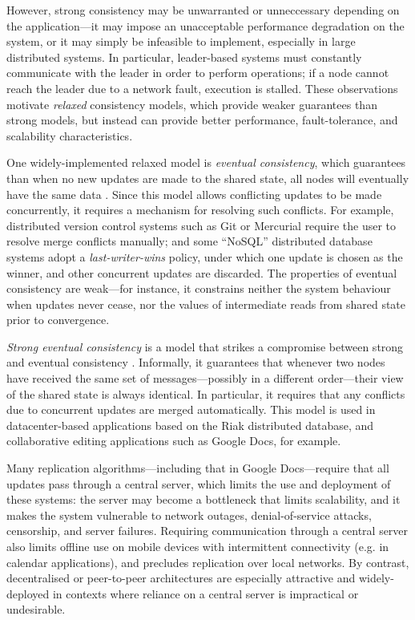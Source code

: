 \documentclass[acmlarge,review,anonymous]{acmart}\settopmatter{printfolios=true}
\begin{document}
However, strong consistency may be unwarranted or unneccessary depending on the application---it may impose an unacceptable performance degradation on the system, or it may simply be infeasible to implement, especially in large distributed systems.
In particular, leader-based systems must constantly communicate with the leader in order to perform operations; if a node cannot reach the leader due to a network fault, execution is stalled.
These observations motivate \emph{relaxed} consistency models, which provide weaker guarantees than strong models, but instead can provide better performance, fault-tolerance, and scalability characteristics.

One widely-implemented relaxed model is \emph{eventual consistency}, which guarantees than when no new updates are made to the shared state, all nodes will eventually have the same data \cite{Bailis:2013jc,Burckhardt:2014hy,Terry:1994fp,Vogels:2009ca}.
Since this model allows conflicting updates to be made concurrently, it requires a mechanism for resolving such conflicts.
For example, distributed version control systems such as Git or Mercurial require the user to resolve merge conflicts manually; and some ``NoSQL'' distributed database systems adopt a \emph{last-writer-wins} policy, under which one update is chosen as the winner, and other concurrent updates are discarded.
The properties of eventual consistency are weak---for instance, it constrains neither the system behaviour when updates never cease, nor the values of intermediate reads from shared state prior to convergence.

\emph{Strong eventual consistency} is a model that strikes a compromise between strong and eventual consistency \cite{Shapiro:2011un}.
Informally, it guarantees that whenever two nodes have received the same set of messages---possibly in a different order---their view of the shared state is always identical.
In particular, it requires that any conflicts due to concurrent updates are merged automatically.
This model is used in datacenter-based applications based on the Riak distributed database, and collaborative editing applications such as Google Docs, for example.

Many replication algorithms---including that in Google Docs---require that all updates pass through a central server, which limits the use and deployment of these systems: the server may become a bottleneck that limits scalability, and it makes the system vulnerable to network outages, denial-of-service attacks, censorship, and server failures.
Requiring communication through a central server also limits offline use on mobile devices with intermittent connectivity (e.g. in calendar applications), and precludes replication over local networks.
By contrast, decentralised or peer-to-peer architectures are especially attractive and widely-deployed in contexts where reliance on a central server is impractical or undesirable.
\end{document}
